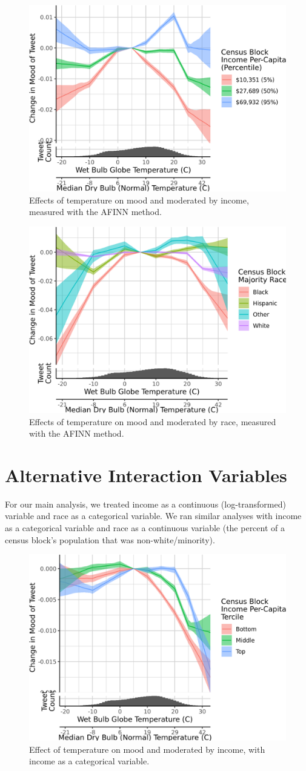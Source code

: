 \documentclass[9pt,twoside,lineno]{pnas-new}
\begin{document}
\begin{figure}[H]
  \centering
  \includegraphics[width=0.6\linewidth]{../../../res/afinn-wbgt-income.png}
  \caption{Effects of temperature on mood and moderated by income, measured with the AFINN method.}
\end{figure}

\begin{figure}[H]
  \centering
  \includegraphics[width=0.6\linewidth]{../../../res/afinn-wbgt-race_q.png}
  \caption{Effects of temperature on mood and moderated by race, measured with the AFINN method.}
\end{figure}


\newpage
\section*{Alternative Interaction Variables}
For our main analysis, we treated income as a continuous (log-transformed) variable and race as a categorical variable.  We ran similar analyses with income as a categorical variable and race as a continuous variable (the percent of a census block's population that was non-white/minority).

\begin{figure}[H]
  \centering
  \includegraphics[width=0.6\linewidth]{../../../res/wbgt-income_q.png}
  \caption{Effect of temperature on mood and moderated by income, with income as a categorical variable.}
\end{figure}
\end{document}

